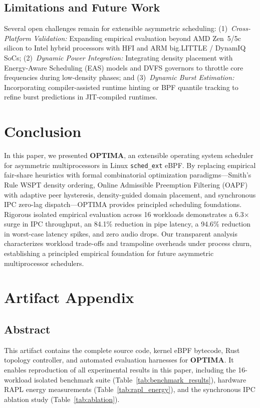 \documentclass[conference]{IEEEtran}
\begin{document}
\subsection{Limitations and Future Work}
Several open challenges remain for extensible asymmetric scheduling: (1)~\emph{Cross-Platform Validation:} Expanding empirical evaluation beyond AMD Zen~5/5c silicon to Intel hybrid processors with HFI and ARM big.LITTLE / DynamIQ SoCs; (2)~\emph{Dynamic Power Integration:} Integrating density placement with Energy-Aware Scheduling (EAS) models and DVFS governors to throttle core frequencies during low-density phases; and (3)~\emph{Dynamic Burst Estimation:} Incorporating compiler-assisted runtime hinting or BPF quantile tracking to refine burst predictions in JIT-compiled runtimes.

\section{Conclusion}
\label{sec:conclusion}

In this paper, we presented \textbf{OPTIMA}, an extensible operating system scheduler for asymmetric multiprocessors in Linux \texttt{sched\_ext} eBPF. By replacing empirical fair-share heuristics with formal combinatorial optimization paradigms---Smith's Rule WSPT density ordering, Online Admissible Preemption Filtering (OAPF) with adaptive peer hysteresis, density-guided domain placement, and synchronous IPC zero-lag dispatch---OPTIMA provides principled scheduling foundations. Rigorous isolated empirical evaluation across 16 workloads demonstrates a 6.3$\times$ surge in IPC throughput, an 84.1\% reduction in pipe latency, a 94.6\% reduction in worst-case latency spikes, and zero audio drops. Our transparent analysis characterizes workload trade-offs and trampoline overheads under process churn, establishing a principled empirical foundation for future asymmetric multiprocessor schedulers.





\appendix
\section{Artifact Appendix}
\label{sec:artifact_appendix}

\subsection{Abstract}
This artifact contains the complete source code, kernel eBPF bytecode, Rust topology controller, and automated evaluation harnesses for \textbf{OPTIMA}. It enables reproduction of all experimental results in this paper, including the 16-workload isolated benchmark suite (Table~\ref{tab:benchmark_results}), hardware RAPL energy measurements (Table~\ref{tab:rapl_energy}), and the synchronous IPC ablation study (Table~\ref{tab:ablation}).
\end{document}
